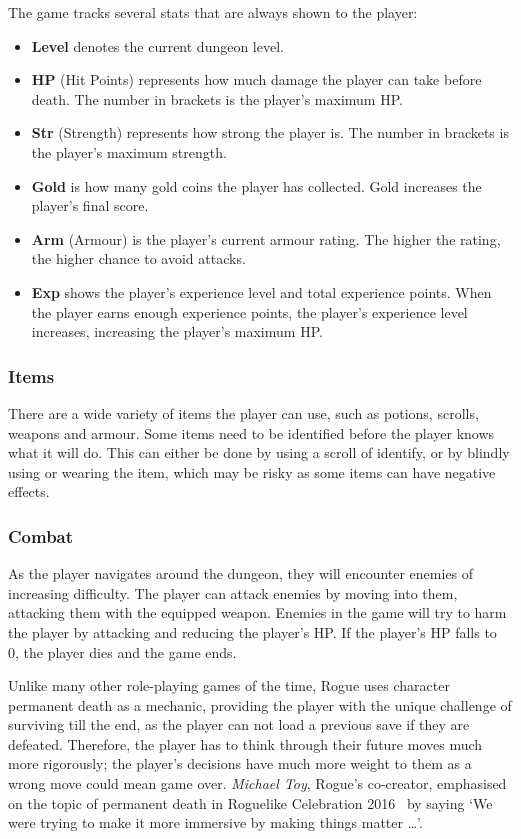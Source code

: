 \documentclass[12pt,a4paper]{article}
\begin{document}
    The game tracks several stats that are always shown to the player:
    \begin{itemize}
        \item \textbf{Level} denotes the current dungeon level.
        \item \textbf{HP} (Hit Points) represents how much damage the player can take before death.
        The number in brackets is the player's maximum HP.
        \item \textbf{Str} (Strength) represents how strong the player is.
        The number in brackets is the player's maximum strength.
        \item \textbf{Gold} is how many gold coins the player has collected.
        Gold increases the player's final score.
        \item \textbf{Arm} (Armour) is the player's current armour rating.
        The higher the rating, the higher chance to avoid attacks.
        \item \textbf{Exp} shows the player's experience level and total experience points.
        When the player earns enough experience points, the player's experience level increases, increasing the player's maximum HP.
    \end{itemize}

    \subsubsection{Items}\label{subsubsec:items}
    There are a wide variety of items the player can use, such as potions, scrolls, weapons and armour.
    Some items need to be identified before the player knows what it will do.
    This can either be done by using a scroll of identify, or by blindly using or wearing the item, which may be risky as some items can have negative effects.

    \subsubsection{Combat}\label{subsubsec:combat}
    As the player navigates around the dungeon, they will encounter enemies of increasing difficulty.
    The player can attack enemies by moving into them, attacking them with the equipped weapon.
    Enemies in the game will try to harm the player by attacking and reducing the player's HP\@.
    If the player's HP falls to 0, the player dies and the game ends.

    Unlike many other role-playing games of the time, Rogue uses character permanent death as a mechanic, providing the player with
    the unique challenge of surviving till the end, as the player can not load a previous save if they are defeated.
    Therefore, the player has to think through their future moves much more rigorously;
    the player's decisions have much more weight to them as a wrong move could mean game over.
    \emph{Michael Toy}, Rogue's co-creator, emphasised on the topic of permanent death in Roguelike Celebration 2016~\citep{gamasutra16} by saying `We were trying to make it more immersive by making things matter \ldots'.
\end{document}
